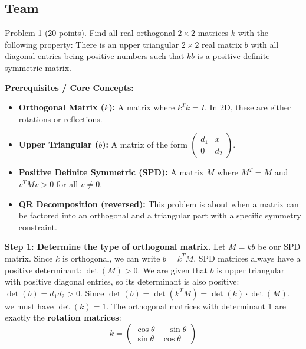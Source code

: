 \subsection*{Team}
\begin{exercise}
\label{algebra:2016:6}
Problem 1 (20 points). Find all real orthogonal $2 \times 2$ matrices $k$ with the following property: There is an upper triangular $2 \times 2$ real matrix $b$ with all diagonal entries being positive numbers such that $k b$ is a positive definite symmetric matrix.
\end{exercise}
\begin{solution}
\textbf{Prerequisites / Core Concepts:}
\begin{itemize}
    \item \textbf{Orthogonal Matrix ($k$):} A matrix where $k^T k = I$. In 2D, these are either rotations or reflections.
    \item \textbf{Upper Triangular ($b$):} A matrix of the form $\begin{pmatrix} d_1 & x \\ 0 & d_2 \end{pmatrix}$.
    \item \textbf{Positive Definite Symmetric (SPD):} A matrix $M$ where $M^T = M$ and $v^T M v > 0$ for all $v \neq 0$.
    \item \textbf{QR Decomposition (reversed):} This problem is about when a matrix can be factored into an orthogonal and a triangular part with a specific symmetry constraint.
\end{itemize}

\textbf{Step 1: Determine the type of orthogonal matrix.}
Let $M = kb$ be our SPD matrix. Since $k$ is orthogonal, we can write $b = k^T M$.
SPD matrices always have a positive determinant: $\det(M) > 0$.
We are given that $b$ is upper triangular with positive diagonal entries, so its determinant is also positive: $\det(b) = d_1 d_2 > 0$.
Since $\det(b) = \det(k^T M) = \det(k) \cdot \det(M)$, we must have $\det(k) = 1$.
The orthogonal matrices with determinant 1 are exactly the \textbf{rotation matrices}:
\[ k = \begin{pmatrix} \cos \theta & -\sin \theta \\ \sin \theta & \cos \theta \end{pmatrix} \]


\end{solution}
